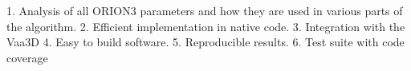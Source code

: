 1. Analysis of all ORION3 parameters and how they are used in various parts of the algorithm.
2. Efficient implementation in native code.
3. Integration with the Vaa3D
4. Easy to build software.
5. Reproducible results.
6. Test suite with code coverage 
